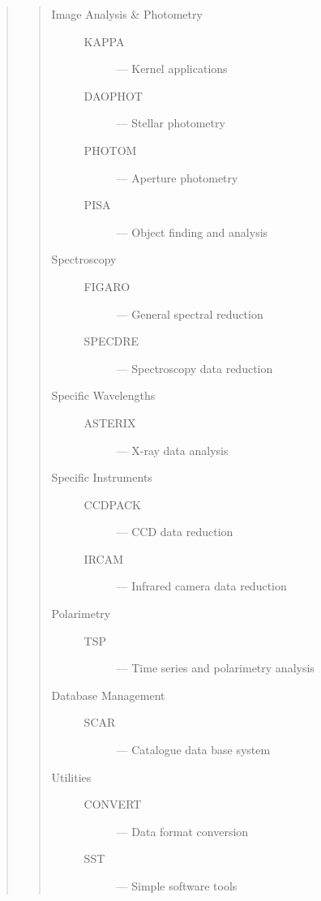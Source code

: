 \begin{quote}

\begin{quote}
\begin{description}

\item [Image Analysis \& Photometry] \mbox{}
\begin{description}
\item [KAPPA] --- Kernel applications
\item [DAOPHOT] --- Stellar photometry
\item [PHOTOM] --- Aperture photometry
\item [PISA] --- Object finding and analysis
\end{description}

\item [Spectroscopy] \mbox{}
\begin{description}
\item [FIGARO] --- General spectral reduction
\item [SPECDRE] --- Spectroscopy data reduction
\end{description}

\item [Specific Wavelengths] \mbox{}
\begin{description}
\item [ASTERIX] --- X-ray data analysis
\end{description}

\item [Specific Instruments] \mbox{}
\begin{description}
\item [CCDPACK] --- CCD data reduction
\item [IRCAM] --- Infrared camera data reduction
\end{description}

\item [Polarimetry] \mbox{}
\begin{description}
\item [TSP] --- Time series and polarimetry analysis
\end{description}

\item [Database Management] \mbox{}
\begin{description}
\item [SCAR] --- Catalogue data base system
\end{description}

\item [Utilities] \mbox{}
\begin{description}
\item [CONVERT] --- Data format conversion
\item [SST] --- Simple software tools
\end{description}

\end{description}
\end{quote}

\end{quote}

